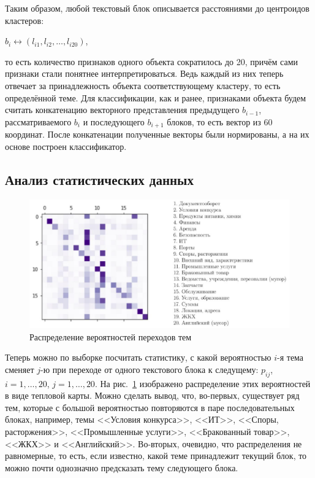 \documentclass[14pt]{matmex-diploma-custom}
\begin{document}
Таким образом, любой текстовый блок описывается расстояниями до центроидов кластеров:

\begin{center}
	$b_i \leftrightarrow (l_{i1}, l_{i2},\ldots, l_{i20})$,
\end{center}

\noindent то есть количество признаков одного объекта сократилось до 20, причём сами признаки стали понятнее интерпретироваться. Ведь каждый из них теперь отвечает за принадлежность объекта соответствующему кластеру, то есть определённой теме. Для классификации, как и ранее, признаками объекта будем считать конкатенацию векторного представления предыдущего $b_{i-1}$, рассматриваемого $b_i$ и последующего $b_{i+1}$ блоков, то есть вектор из 60 координат. После конкатенации полученные векторы были нормированы, а на их основе построен классификатор.

\subsection{Анализ статистических данных}
\begin{figure}[h!]
	\includegraphics[scale=0.85]{images/im5.eps}
	\caption{Распределение вероятностей переходов тем}
	\label{im5}
\end{figure}
Теперь можно по выборке посчитать статистику, с какой вероятностью $i$-я тема сменяет $j$-ю при переходе от одного текстового блока к следущему: $p_{ij}$, $i = 1,\ldots, 20$, $j = 1,\ldots, 20$. На рис.~\ref{im5} изображено распределение этих вероятностей в виде тепловой карты. Можно сделать вывод, что, во-первых, существует ряд тем, которые с большой вероятностью повторяются в паре последовательных блоках, например, темы <<Условия конкурса>>, <<ИТ>>, <<Споры, расторжения>>, <<Промышленные услуги>>, <<Бракованный товар>>, <<ЖКХ>> и <<Английский>>. Во-вторых, очевидно, что распределения не равномерные, то есть, если известно, какой теме принадлежит текущий блок, то можно почти однозначно предсказать тему следующего блока. 
\end{document}
